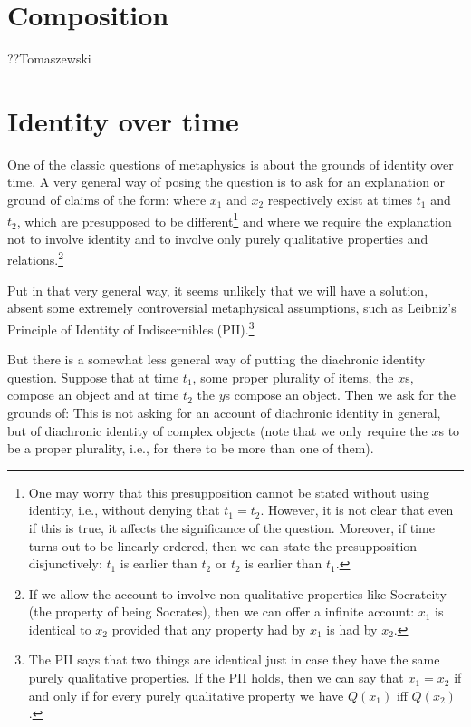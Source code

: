 \section{Composition}
??Tomaszewski

\section{Identity over time}
One of the classic questions of metaphysics is about the grounds of identity over time. 
A very general way of posing the question is to ask for an explanation or ground of claims
of the form:
where $x_1$ and $x_2$ respectively exist at times $t_1$ and $t_2$, which are presupposed to be different\footnote{One may worry that this
presupposition cannot be stated without using identity, i.e., without denying that
$t_1=t_2$. However, it is not clear that even if this is true, it affects the
significance of the question. Moreover, if time turns out to be linearly ordered,
then we can state the presupposition disjunctively: $t_1$ is earlier than $t_2$ 
or $t_2$ is earlier than $t_1$.} and where we require the explanation not to
involve identity and to involve only purely qualitative properties and 
relations.\footnote{If we allow the account to involve non-qualitative properties 
like Socrateity (the property of being Socrates), then we can offer a infinite 
account: $x_1$ is identical to $x_2$ provided that any property had by $x_1$ is 
had by $x_2$.}

Put in that very general way, it seems unlikely that we will have a solution, 
absent some extremely controversial metaphysical assumptions, such as 
Leibniz's Principle of Identity of Indiscernibles (PII).\footnote{The PII says
that two things are identical just in case they have the same purely qualitative
properties. If the PII holds, then we can say that $x_1=x_2$ if and only if 
for every purely qualitative property we have $Q(x_1)$ iff $Q(x_2)$.} 

But there is a somewhat less general way of putting the diachronic identity question.
Suppose that at time $t_1$, some proper plurality of items, the $x$s, compose an 
object and at time $t_2$ the $y$s compose an object. Then we ask for the grounds of:
This is not asking for an account of diachronic identity in general, but of diachronic
identity of complex objects (note that we only require the $x$s to be a proper
plurality, i.e., for there to be more than one of them).
    
